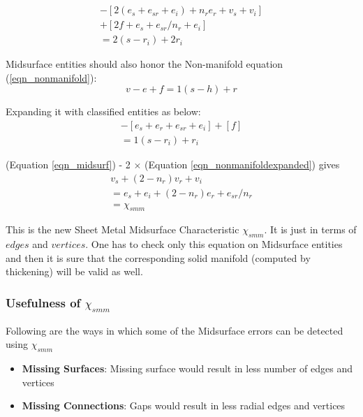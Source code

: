 \vspace{-5mm}
\begin{multline}
[2 (v_s + v_i) +n_{r} v_r ]\\
-[2(e_s+e_{sr}+e_i )+n_{r} e_{r}+v_s+v_i ]\\
+[2f+e_s+e_{sr}/n_{r} +e_i ]\\
=2(s-r_i )+2r_i
\label{eqn_midsurf}
\end{multline}

Midsurface entities should also honor the Non-manifold equation (\ref{eqn_nonmanifold}):
\begin{equation}
v-e+f=1(s-h)+r
\label{eqn_nonmanifold}
\end{equation}

Expanding it with classified entities as below:
\begin{align}
[v_s+v_r+v_i]-[e_s+e_r+e_{sr}+e_i ]+[f]\\=1(s-r_i )+r_i
\label{eqn_nonmanifoldexpanded}
\end{align}

(Equation \ref{eqn_midsurf}) - 2 $\times$ (Equation  \ref{eqn_nonmanifoldexpanded}) gives
\begin{align}
v_s+(2-n_{r} ) v_{r}+v_i \\= e_s+e_i+(2-n_{r}) e_{r}+e_{sr}/n_{r}\\=\chi_{smm}
\label{eqn_nonmanifolddiff}
\end{align}

This is the new Sheet Metal Midsurface Characteristic  $\chi_{smm}$. It is just in terms of $edges$ and $vertices$. One has to check only this equation on Midsurface entities and then it is sure that the corresponding solid manifold (computed by thickening) will be valid as well.

\subsubsection{Usefulness of $\chi_{smm}$}
Following are the ways in which some of the Midsurface errors can be detected using $\chi_{smm}$
\begin{itemize}
[noitemsep,topsep=2pt,parsep=2pt,partopsep=2pt,leftmargin=*]
\item \textbf{Missing Surfaces}: Missing surface would result in less number of edges and vertices
\item \textbf{Missing Connections}: Gaps would result in less radial edges and vertices 
\end{itemize}

